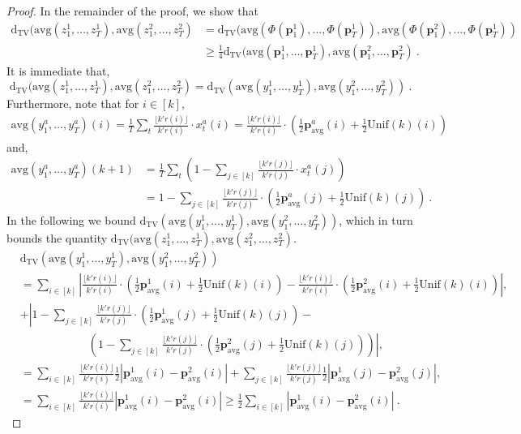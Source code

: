 \documentclass[10pt]{article} %
\theoremstyle{plain}
\newcommand{\bp}{\textbf{p}}
\newcommand{\unik}{\mathrm{Unif}(k)}%
\newcommand{\dtv}{\mathrm{d_{TV}}}
\newcommand{\avg}{\mathrm{avg}}
\begin{document}
\begin{proof}
	In the remainder of the proof, we show that
	\begin{align*}
		\dtv(\avg(z_1^1,\dots,z_T^1),\avg(z_1^2,\dots,z_T^2)&=\dtv(\avg(\Phi(\bp^1_1),\dots,\Phi(\bp^1_T)),\avg(\Phi(\bp^2_1),\dots,\Phi(\bp^1_T)) \\
		&\geq \frac{1}{4}\dtv(\avg(\bp^1_1,\dots,\bp^1_T),\avg(\bp^2_1,\dots,\bp^2_T)~.  
	\end{align*}
	It is immediate that,
	$$\dtv(\avg(z_1^1,\dots,z_T^1),\avg(z_1^2,\dots,z_T^2)=\dtv(\avg(y_1^1,\dots,y_T^1),\avg(y_1^2,\dots,y_T^2))~.$$
	Furthermore, note that for $i \in [k]$,
	\begin{align*}
		\avg(y_1^a,\dots,y_T^a)(i)=\frac{1}{T}\sum_{t}\frac{\lfloor k'r(i)\rfloor}{k'r(i)} \cdot x^a_t(i)=\frac{\lfloor k'r(i)\rfloor}{k'r(i)} \cdot (\frac{1}{2}\bp^a_{\avg}(i)+\frac{1}{2}\unik(i))
	\end{align*}
	and,
	\begin{align*}
		\avg(y_1^a,\dots,y_T^a)(k+1)&=\frac{1}{T}\sum_{t}\left(1-\sum_{j \in [k]}\frac{\lfloor k'r(j)\rfloor}{k'r(j)} \cdot x^a_t(j) \right)\\
		&=
		1-\sum_{j \in [k]}\frac{\lfloor k'r(j)\rfloor}{k'r(j)} \cdot (\frac{1}{2}\bp^a_{\avg}(j)+\frac{1}{2}\unik(j))~.
	\end{align*}
	In the following we bound $\dtv(\avg(y_1^1,\dots,y_T^1),\avg(y_1^2,\dots,y_T^2))$, which in turn bounds the quantity $\dtv(\avg(z_1^1,\dots,z_T^1),\avg(z_1^2,\dots,z_T^2)$.
	\begin{align*}
		&\dtv(\avg(y_1^1,\dots,y_T^1),\avg(y_1^2,\dots,y_T^2))\\&=\sum_{i \in [k]}\left|\frac{\lfloor k'r(i)\rfloor}{k'r(i)} \cdot (\frac{1}{2}\bp^1_{\avg}(i)+\frac{1}{2}\unik(i))-\frac{\lfloor k'r(i)\rfloor}{k'r(i)} \cdot (\frac{1}{2}\bp^2_{\avg}(i)+\frac{1}{2}\unik(i))\right|,\\
		&+\left| 1-\sum_{j \in [k]}\frac{\lfloor k'r(j)\rfloor}{k'r(j)} \cdot (\frac{1}{2}\bp^1_{\avg}(j)+\frac{1}{2}\unik(j))-\right.\\
		&\qquad\qquad\qquad\left.\left(1-\sum_{j \in [k]}\frac{\lfloor k'r(j)\rfloor}{k'r(j)} \cdot (\frac{1}{2}\bp^2_{\avg}(j)+\frac{1}{2}\unik(j))\right)\right|,\\
		&=\sum_{i \in [k]}\frac{\lfloor k'r(i)\rfloor}{k'r(i)}\frac{1}{2}\left| \bp^1_{\avg}(i)-\bp^2_{\avg}(i)\right|+
		\sum_{j \in [k]}\frac{\lfloor k'r(j)\rfloor}{k'r(j)}\frac{1}{2}\left| \bp^1_{\avg}(j)-\bp^2_{\avg}(j)\right|,\\
		&=\sum_{i \in [k]}\frac{\lfloor k'r(i)\rfloor}{k'r(i)}\left| \bp^1_{\avg}(i)-\bp^2_{\avg}(i)\right|\geq \frac{1}{2}\sum_{i \in [k]}\left| \bp^1_{\avg}(i)-\bp^2_{\avg}(i)\right|~.

\end{align*}
\end{proof}
\end{document}
